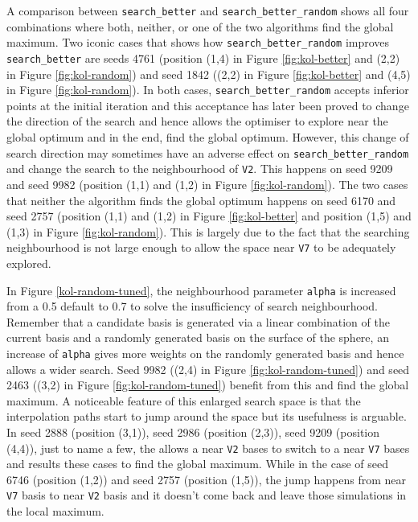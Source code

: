 \documentclass[12pt]{article}
\begin{document}
A comparison between \texttt{search\_better} and \texttt{search\_better\_random} shows all four combinations where both, neither, or one of the two algorithms find the global maximum. Two iconic cases that shows how \texttt{search\_better\_random} improves \texttt{search\_better} are seeds 4761 (position (1,4) in Figure \ref{fig:kol-better} and (2,2) in Figure \ref{fig:kol-random}) and seed 1842 ((2,2) in Figure \ref{fig:kol-better} and (4,5) in Figure \ref{fig:kol-random}). In both cases, \texttt{search\_better\_random} accepts inferior points at the initial iteration and this acceptance has later been proved to change the direction of the search and hence allows the optimiser to explore near the global optimum and in the end, find the global optimum. However, this change of search direction may sometimes have an adverse effect on \texttt{search\_better\_random} and change the search to the neighbourhood of \texttt{V2}. This happens on seed 9209 and seed 9982 (position (1,1) and (1,2) in Figure \ref{fig:kol-random}). The two cases that neither the algorithm finds the global optimum happens on seed 6170 and seed 2757 (position (1,1) and (1,2) in Figure \ref{fig:kol-better} and position (1,5) and (1,3) in Figure \ref{fig:kol-random}). This is largely due to the fact that the searching neighbourhood is not large enough to allow the space near \texttt{V7} to be adequately explored.

In Figure \ref{kol-random-tuned}, the neighbourhood parameter \texttt{alpha} is increased from a 0.5 default to 0.7 to solve the insufficiency of search neighbourhood. Remember that a candidate basis is generated via a linear combination of the current basis and a randomly generated basis on the surface of the sphere, an increase of \texttt{alpha} gives more weights on the randomly generated basis and hence allows a wider search. Seed 9982 ((2,4) in Figure \ref{fig:kol-random-tuned}) and seed 2463 ((3,2) in Figure \ref{fig:kol-random-tuned}) benefit from this and find the global maximum. A noticeable feature of this enlarged search space is that the interpolation paths start to jump around the space but its usefulness is arguable. In seed 2888 (position (3,1)), seed 2986 (position (2,3)), seed 9209 (position (4,4)), just to name a few, the allows a near \texttt{V2} bases to switch to a near \texttt{V7} bases and results these cases to find the global maximum. While in the case of seed 6746 (position (1,2)) and seed 2757 (position (1,5)), the jump happens from near \texttt{V7} basis to near \texttt{V2} basis and it doesn't come back and leave those simulations in the local maximum.
\end{document}
